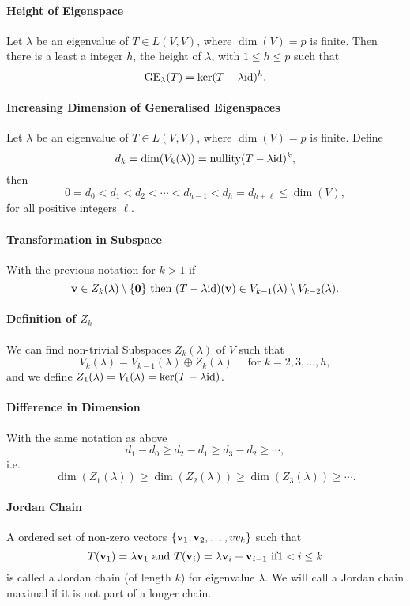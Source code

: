 \paragraph{Height of Eigenspace}
Let \(\lambda\) be an eigenvalue of \(T \in L(V,V)\), where \(\dim(V) = p\) is finite. Then there is a least a integer \(h\), the height of \(\lambda\), with \(1 \leq h \leq p\) such that
\[\operatorname{GE}_\lambda(T) = \ker(T - \lambda\mathrm{id})^h.\]

\paragraph{Increasing Dimension of Generalised Eigenspaces}
Let \(\lambda\) be an eigenvalue of \(T \in L(V,V)\), where \(\dim(V) = p\) is finite. Define
\[d_k = \dim(V_k(\lambda)) = \mathrm{nullity}(T - \lambda\mathrm{id})^k,\]
then
\[0 = d_0 < d_1 < d_2 < \cdots < d_{h-1} < d_h = d_{h + \ell} \leq \dim(V),\]
for all positive integers \(\ell\).

\paragraph{Transformation in Subspace}
With the previous notation for \(k > 1\) if
\[\mathbf{v} \in Z_k(\lambda) \setminus \{\mathbf{0}\} \text{ then } (T - \lambda\mathrm{id})(\mathbf{v}) \in V_{k-1}(\lambda) \setminus V_{k-2}(\lambda).\]

\paragraph{Definition of \(Z_k\)}
We can find non-trivial Subspaces \(Z_k(\lambda)\) of \(V\) such that
\[V_k(\lambda) = V_{k-1}(\lambda) \oplus Z_k(\lambda) \quad \text{ for } k = 2,3,\dots, h,\]
and we define \(Z_1(\lambda) = V_1(\lambda) = \ker(T - \lambda\mathrm{id})\).

\paragraph{Difference in Dimension}
With the same notation as above
\[d_1 - d_0 \geq d_2 - d_1 \geq d_3 - d_2 \geq \cdots,\]
i.e.
\[\dim(Z_1(\lambda)) \geq \dim(Z_2(\lambda)) \geq \dim(Z_3(\lambda)) \geq \cdots.\]

\paragraph{Jordan Chain}
A ordered set of non-zero vectors \(\{\mathbf{v}_1, \mathbf{v}_2, \dots, vv_k\}\) such that
\[T(\mathbf{v}_1) = \lambda\mathbf{v}_1 \text{ and } T(\mathbf{v}_i) = \lambda\mathbf{v}_i + \mathbf{v}_{i-1} \text{ if} 1 < i \leq k\]
is called a Jordan chain (of length \(k\)) for eigenvalue \(\lambda\).
We will call a Jordan chain maximal if it is not part of a longer chain.

